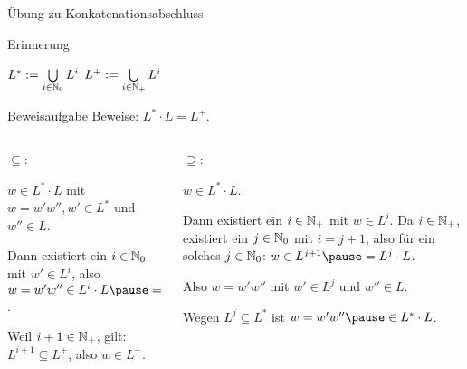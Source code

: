 \begin{frame}{Übung zu Konkatenationsabschluss}
	\begin{exampleblock}{Erinnerung}
		\begin{center}
			$L^* := \bigcup\limits_{i \in \mathbb{N}_0} L^i$\qquad
			$L^+ := \bigcup\limits_{i \in \mathbb{N}_+} L^i$
		\end{center}
	\end{exampleblock}

	\begin{taskblock}{Beweisaufgabe}
		Beweise: $L^* \cdot L = L^+$.
	\end{taskblock}

	\pause
	\begin{columns}
		\begin{column}{0.4\textwidth}
			$\subseteq$:
			
			\p{} \p $w \in L^* \cdot L$ mit $w = w'w'', w' \in L^*$ und $w'' \in L$.
			
			\vspace{.3cm}
			
			\p Dann existiert ein $i \in \mathbb{N}_0$ mit $w' \in L^i$\p , also $w = w'w'' \in L^i \cdot L \p = L^{i+1}$.
			
			\vspace{.3cm}
			
			\p Weil $i+1\in \mathbb{N}_+$\p , gilt: $L^{i+1} \subseteq L^+$\p , also $w \in L^+$.
		\end{column}
		
		\begin{column}{0.6\textwidth}
			$\supseteq$:
			
			\p{} \p $w \in L^*\cdot L$.
			
			\vspace{.3cm}
			
			\p Dann existiert ein $i \in \mathbb{N}_+$ mit $w \in L^i$. \p Da $i \in \mathbb{N}_+$\p , existiert ein $j \in \mathbb{N}_0$ mit $i = j+1$\p , also für ein solches $j \in \mathbb{N}_0$\p : $w \in L^{j+1} \p = L^j \cdot L$.
			
			\vspace{.3cm}
			
			\p Also $w = w'w''$ mit $w' \in L^j$ und $w'' \in L$.
			
			\vspace{.3cm}
			
			\p Wegen $L^j \subseteq L^*$ \p ist $w = w'w'' \p \in L^* \cdot L$.
		\end{column}
	\end{columns}
\end{frame}


